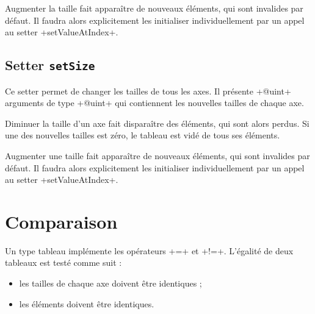 Augmenter la taille fait apparaître de nouveaux éléments, qui sont invalides par défaut. Il faudra alors explicitement les initialiser individuellement par un appel au setter \ggst+setValueAtIndex+.




\subsection{Setter \texttt{setSize}}

Ce setter permet de changer les tailles de tous les axes. Il présente \ggst+@uint+ arguments de type \ggst+@uint+ qui contiennent les nouvelles tailles de chaque axe.

Diminuer la taille d'un axe fait disparaître des éléments, qui sont alors perdus. Si une des nouvelles tailles est zéro, le tableau est vidé de tous ses éléments.

Augmenter une taille fait apparaître de nouveaux éléments, qui sont invalides par défaut. Il faudra alors explicitement les initialiser individuellement par un appel au setter \ggst+setValueAtIndex+.


\section{Comparaison}

Un type tableau implémente les opérateurs \ggst+=+ et \ggst+!=+. L'égalité de deux tableaux est testé comme suit :
\begin{itemize}
  \item les tailles de chaque axe doivent être identiques ;
  \item les éléments doivent être identiques.
\end {itemize}
